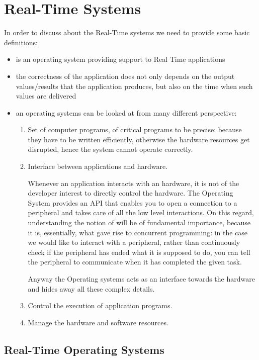 \section{Real-Time Systems}
In order to discuss about the Real-Time systems we need to provide some basic definitions:
\begin{itemize}
\item{ is an operating system providing support to Real Time applications}
\item{ the correctness of the application does not only depends on the output values/results that the application produces, but also on the time when such values are delivered}
\item{ an operating systems can be looked at from many different perspective:}
\begin{enumerate}
\item Set of computer programs, of critical programs to be precise: because they have to be written efficiently, otherwise the hardware resources get disrupted, hence the system cannot operate correctly.
\item Interface between applications and hardware. 

Whenever an application interacts with an hardware, it is not of the developer interest to directly control the hardware. The Operating System provides an API that enables you to open a connection to a peripheral and takes care of all the low level interactions.
On this regard, understanding the notion of  will be of fundamental importance, because it is, essentially, what gave rise to concurrent programming: in the case we would like to interact with a peripheral, rather than continuously check if the peripheral has ended what it is supposed to do, you can tell the peripheral to communicate when it has completed the given task.

Anyway the Operating systems acts as an interface towards the hardware and hides away all these complex details.
\item Control the execution of application programs.
\item Manage the hardware and software resources.
\end{enumerate}
\end{itemize}

\subsection{Real-Time Operating Systems}

